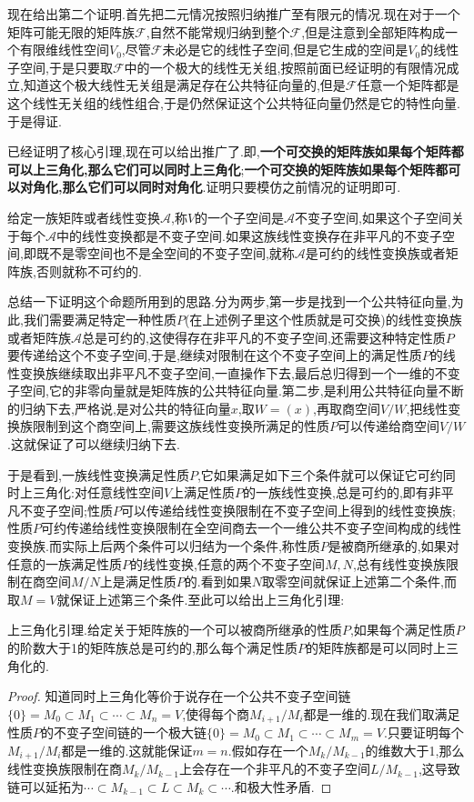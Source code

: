 现在给出第二个证明.首先把二元情况按照归纳推广至有限元的情况.现在对于一个矩阵可能无限的矩阵族$\mathscr{F}$,自然不能常规归纳到整个$\mathscr{F}$,但是注意到全部矩阵构成一个有限维线性空间$V_0$,尽管$\mathscr{F}$未必是它的线性子空间,但是它生成的空间是$V_0$的线性子空间,于是只要取$\mathscr{F}$中的一个极大的线性无关组,按照前面已经证明的有限情况成立,知道这个极大线性无关组是满足存在公共特征向量的,但是$\mathscr{F}$任意一个矩阵都是这个线性无关组的线性组合,于是仍然保证这个公共特征向量仍然是它的特性向量.于是得证.

已经证明了核心引理,现在可以给出推广了.即,\textbf{一个可交换的矩阵族如果每个矩阵都可以上三角化,那么它们可以同时上三角化};\textbf{一个可交换的矩阵族如果每个矩阵都可以对角化,那么它们可以同时对角化}.证明只要模仿之前情况的证明即可.

给定一族矩阵或者线性变换$\mathscr{A}$,称$V$的一个子空间是$\mathscr{A}$不变子空间,如果这个子空间关于每个$\mathscr{A}$中的线性变换都是不变子空间.如果这族线性变换存在非平凡的不变子空间,即既不是零空间也不是全空间的不变子空间,就称$\mathscr{A}$是可约的线性变换族或者矩阵族,否则就称不可约的.

总结一下证明这个命题所用到的思路.分为两步,第一步是找到一个公共特征向量,为此,我们需要满足特定一种性质$P$(在上述例子里这个性质就是可交换)的线性变换族或者矩阵族$\mathscr{A}$总是可约的,这使得存在非平凡的不变子空间,还需要这种特定性质$P$要传递给这个不变子空间,于是,继续对限制在这个不变子空间上的满足性质$P$的线性变换族继续取出非平凡不变子空间,一直操作下去,最后总归得到一个一维的不变子空间,它的非零向量就是矩阵族的公共特征向量.第二步,是利用公共特征向量不断的归纳下去,严格说,是对公共的特征向量$x$,取$W=(x)$,再取商空间$V/W$,把线性变换族限制到这个商空间上,需要这族线性变换所满足的性质$P$可以传递给商空间$V/W$.这就保证了可以继续归纳下去.

于是看到,一族线性变换满足性质$P$,它如果满足如下三个条件就可以保证它可约同时上三角化:对任意线性空间$V$上满足性质$P$的一族线性变换,总是可约的,即有非平凡不变子空间;性质$P$可以传递给线性变换限制在不变子空间上得到的线性变换族;性质$P$可约传递给线性变换限制在全空间商去一个一维公共不变子空间构成的线性变换族.而实际上后两个条件可以归结为一个条件,称性质$P$是被商所继承的,如果对任意的一族满足性质$P$的线性变换,任意的两个不变子空间$M,N$,总有线性变换族限制在商空间$M/N$上是满足性质$P$的.看到如果$N$取零空间就保证上述第二个条件,而取$M=V$就保证上述第三个条件.至此可以给出上三角化引理:

上三角化引理.给定关于矩阵族的一个可以被商所继承的性质$P$,如果每个满足性质$P$的阶数大于1的矩阵族总是可约的,那么每个满足性质$P$的矩阵族都是可以同时上三角化的.
\begin{proof}
	
	知道同时上三角化等价于说存在一个公共不变子空间链$\{0\}=M_0\subset M_1\subset\cdots\subset M_n=V$,使得每个商$M_{i+1}/M_i$都是一维的.现在我们取满足性质$P$的不变子空间链的一个极大链$\{0\}=M_0\subset M_1\subset\cdots\subset M_m=V$.只要证明每个$M_{i+1}/M_i$都是一维的.这就能保证$m=n$.假如存在一个$M_{k}/M_{k-1}$的维数大于1,那么线性变换族限制在商$M_{k}/M_{k-1}$上会存在一个非平凡的不变子空间$L/M_{k-1}$,这导致链可以延拓为$\cdots\subset M_{k-1}\subset L\subset M_k\subset\cdots$.和极大性矛盾.
	
\end{proof}

